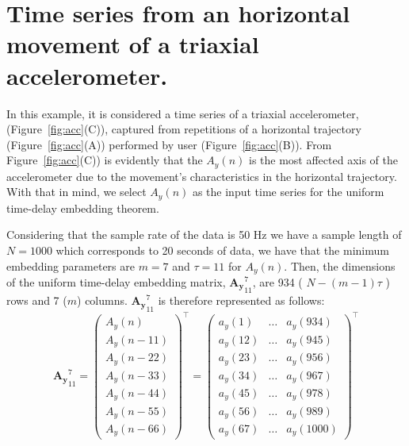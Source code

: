 \section{Time series from an horizontal movement of a triaxial accelerometer.}
In this example, it is considered a time series of a triaxial accelerometer, (Figure~\ref{fig:acc}(C)),
captured from repetitions of a horizontal trajectory (Figure~\ref{fig:acc}(A))
performed by user (Figure~\ref{fig:acc}(B)).
From Figure~\ref{fig:acc}(C)) is evidently that the $A_y(n)$ is 
the most affected axis of the accelerometer due to the movement's 
characteristics in the horizontal trajectory.
With that in mind, we select $A_y(n)$ as the input time series
for the uniform time-delay embedding theorem.

Considering that the sample rate of the data is 50 Hz we have 
a sample length of $N=1000$ which corresponds to 20 seconds of data,
we have that the minimum embedding parameters are 
$m=7$ and $\tau=11$ for $A_y(n)$.
Then, the dimensions of the uniform time-delay embedding matrix, $\boldsymbol{{A_y}}^{7}_{11}$,
are 934 ( $N-(m-1)\tau$ ) rows and 7 ($m$) columns.
$\boldsymbol{{A_y}}^{7}_{11}$ is therefore represented as follows:
\begin{equation} \label{eq:etde1_exampleA2}
\boldsymbol{{A_y}}^{7}_{11}  =
\begin{pmatrix}
  	{ A_y }(n) \\
  	{ A_y }(n-11) \\
	{ A_y }(n-22) \\
	{ A_y }(n-33) \\
	{ A_y }(n-44) \\
	{ A_y }(n-55) \\
  	{ A_y }(n-66) 
\end{pmatrix}^\intercal
=
\begin{pmatrix}
  	a_y(1)  & \dots & a_y(934) \\
  	a_y(12) & \dots & a_y(945) \\
  	a_y(23) & \dots & a_y(956) \\
  	a_y(34) & \dots & a_y(967) \\
  	a_y(45) & \dots & a_y(978) \\
  	a_y(56) & \dots & a_y(989) \\
  	a_y(67) & \dots & a_y(1000) 
\end{pmatrix}^\intercal   
\end{equation}


